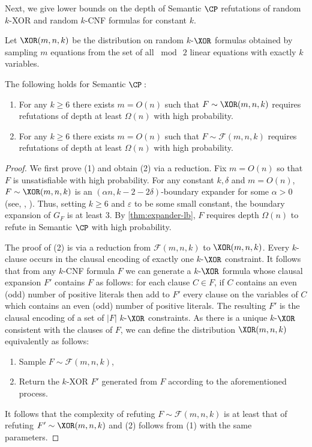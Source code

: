 Next, we give lower bounds on the depth of Semantic $\CP$ refutations of random $k$-XOR and random $k$-CNF formulas for constant $k$.
\begin{definition}
	Let $\XOR(m,n,k)$ be the distribution on random $k$-$\XOR$ formulas obtained by sampling $m$ equations from the set of all $\bmod\ 2$ linear equations with exactly $k$ variables.
\end{definition}
\begin{theorem}\label{thm:randomLB}
The following holds for Semantic $\CP:$
	\begin{enumerate}
		\item[$1$.] For any $k \geq 6$ there exists $m = O(n)$ such that $F \sim \XOR(m,n,k)$ requires refutations of depth at least $\Omega(n)$ with high probability.
		\item[$2$.] For any $k \geq 6$ there exists $m = O(n)$ such that $F \sim \mathcal{F}(m,n,k)$ requires refutations of depth at least $\Omega(n)$ with high probability.
	\end{enumerate}
\end{theorem}
%
\begin{proof}
	We first prove (1) and obtain (2) via a reduction. 
	Fix $m= O(n)$ so that $F$ is unsatisfiable with high probability. 
	For any constant $k,\delta$ and $m=O(n)$,  $F \sim \XOR(m,n,k)$ is an $(\alpha n, k-2-2\delta)$-boundary expander for some $\alpha > 0$ (see, \eg, \cite{BGHMP06,cs-resolution}). 
	Thus, setting $k \geq 6$ and $\varepsilon$ to be some small constant, the boundary expansion of $G_F$ is at least $3$. 
	By \autoref{thm:expander-lb}, $F$ requires depth $\Omega(n)$ to refute in Semantic $\CP$ with high probability.
	
	The proof of (2) is via a reduction from $\mathcal{F}(m,n,k)$ to $\XOR(m,n,k)$. 
	Every $k$-clause occurs in the clausal encoding of exactly one $k$-$\XOR$ constraint. 
	It follows that from any $k$-CNF formula $F$ we can generate a $k$-$\XOR$ formula whose clausal expansion $F'$ contains $F$ as follows:
	for each clause $C \in F$, if $C$ contains an even (odd) number of positive literals then add to $F'$ every clause on the variables of $C$ which contains an even (odd) number of positive literals. The resulting $F'$ is the clausal encoding of a set of $|F|$ $k$-$\XOR$ constraints. As there is a unique $k$-$\XOR$ consistent with the clauses of $F$, we can define the distribution $\XOR(m,n,k)$ equivalently as follows: 
	\begin{enumerate}
		\item Sample $F \sim \mathcal{F}(m,n,k)$,
		\item Return the $k$-XOR $F'$ generated from $F$ according to the aforementioned process.
	\end{enumerate}
	It follows that the complexity of refuting $F \sim \mathcal{F}(m,n,k)$ is at least that of refuting $F' \sim \XOR(m,n,k)$ and (2) follows from (1) with the same parameters. 
\end{proof}

